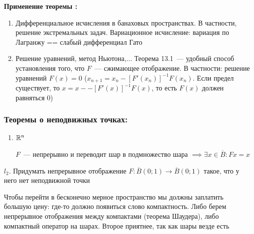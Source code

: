 \textbf{Применение теоремы :}
\begin{enumerate}
    \item Дифференциальное исчисления в банаховых пространствах.
    В частности, решение экстремальных задач.
    Вариационное исчисление: вариация по Лагранжу == слабый дифференциал Гато

    \item Решение уравнений, метод Ньютона,...
    Теорема 13.1~--- удобный способ установления того, что $F$~--- сжимающее отображение.
    В частности: решение уравнений $F(x)=0$ ($x_{n+1}=x_n-[F'(x_n)]^{-1} F(x_n)$. Если предел существует, то $x=x--[F'(x)]^{-1} F(x)$, то есть $F(x)$ должен равняться 0)
\end{enumerate}



\subsubsection{Теоремы о неподвижных точках:}
\begin{enumerate}
    \item $\mathbb{R}^n$
    \begin{theorem} $F$~--- непрерывно и переводит шар в подмножество шара $\implies \exists x \in \overline{B}: Fx=x$
    \end{theorem}
    
\end{enumerate}

\begin{exercise}
    $l_2$. Придумать непрерывное отображение $F: \overline{B}(0; 1) \to \overline{B}(0;1)$ такое, что у него нет неподвижной точки
\end{exercise}


\begin{note}
    Чтобы перейти в бесконечно мерное пространство мы должны заплатить большую цену: где-то должно появиться слово компактность. Либо берем непрерывное отображения между компактами (теорема Шаудера), либо компактный оператор на шарах. Второе приятнее, так как шары везде есть
\end{note}

